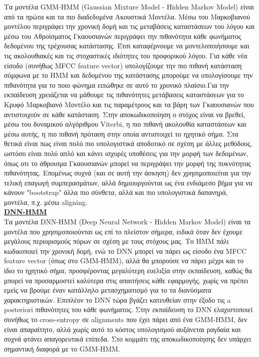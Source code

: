 \documentclass{article}
\begin{document}
Τα μοντέλα GMM-HMM (Gaussian Mixture Model - Hidden Markov Model) είναι από τα πρώτα και τα πιο διαδεδομένα Ακουστικά Μοντέλα. Μέσω του Μαρκοβιανού μοντέλου περιγράφει την χρονική δομή και τις μεταβάσεις καταστάσεων του λόγου και μέσω του Αθροίσματος Γκαουσιανών περιγράφει την πιθανότητα κάθε φωνήματος δεδομένου της τρέχουσας κατάστασης. Έτσι καταφέρνουμε να μοντελοποιήσουμε και τις ακολουθιακές και τις στοχαστικές ιδιότητες του προφορικού λόγου. Για κάθε νέα είσοδο (συνήθως MFCC feature vector) υπολογίζουμε την πιο πιθανή κατάσταση σύμφωνα με το HMM και δεδομένου της κατάστασης μπορούμε να υπολογίσουμε την πιθανότητα για το ποιο φώνημα ειπώθηκε σε αυτό το χρονικό πλαίσιο.Για την εκπαίδευση χρειάζεται να μάθουμε τις πιθανότητες μετάβασεις καταστάσεων για το Κρυφό Μαρκοβιανό Μοντέλο και τις παραμέτρους και τα βάρη των Γκαουσιανών που αντιστοιχούν σε κάθε κατάσταση. Στην αποκωδικοποίηση ο στόχος είναι να βρεθεί, μέσω του δυναμικού αλγόριθμου Viterbi, η πιο πιθανή ακολουθία καταστάσεων και μέσω αυτής, η πιο πιθανή πρόταση στην οποία αντιστοιχεί το ηχητικό σήμα. Στα θετικά είναι πως είναι πολύ πιο υπολογιστικά αποδοτικό σε σχέση με άλλες μεθόδους, ωστόσο είναι πολύ απλό και κάνει ισχυρές υποθέσεις για την μορφή των δεδομένων, όπως οτι το άθροισμα Γκαουσιανών μπορεί να περιγράψει την μορφή της πυκνότητας πιθανότητας. Επομένως συχνά (και σε αυτή την άσκηση) δεν χρησιμοποιείται για την τελική επαγωγή συμπερασμάτων, αλλά δημιουργούνται ως ένα ενδιάμεσο βήμα για να κάνουν "bootstrap" άλλα πιο σύνθετα, αλλά και πιο υπολογιστικά δαπανηρά, μοντέλα, π.χ. μέσω aligning.
%
\\[5mm]
\textbf{\underline{DNN-HMM}}
\label{dnn-hmm}
\\[1mm]
Τα μοντέλα DNN-HMM (Deep Neural Network - Hidden Markov Model) είναι τα μοντέλα που χρησιμοποιούνται ως επί το πλείστον σήμερα, ειδικά όταν δεν έχουμε μεγάλους περιορισμούς πόρων σε σχέση με τους στόχους μας. Το HMM πάλι κωδικοποιεί την χρονική δομή, ενώ το DNN μπορεί να πάρει ως είσοδο ένα MFCC feature vector (όπως στο GMM-HMM), αλλά θα μπορούσε να πάρει μέχρι και το ίδιο το ηχητικό σήμα, προσφέροντας μεγαλύτερη ευελιξία στην εκπαίδευση, καθώς θα μπορεί να προσαρμοστεί καλύτερα στις απαιτήσεις κάθε εφαρμογής, χωρίς να πρέπει εμείς να βρούμε έναν κατάλληλο μετασχηματισμό για το τα διανύσματα χαρακτηριστικών. Επιπλέον το DNN τώρα βγάζει κατευθείαν στην έξοδο τις a posteriori πιθανότητες του κάθε φωνήματος. Στην εκπαίδευση το DNN ελαχιστοποιεί συνήθως το cross-entropy σε alignments που έχει πάρει από ένα GMM-HMM, δεν είναι απαραίτητο, αλλά χωρίς αυτό το κόστος υπολογισμού αυξάνεται ραγδαία και συχνά φτάνει απαγορευτικά επίπεδα.  Στο κομμάτι της αποκωδικοποίησης δεν υπάρχει σημαντική διαφορά με το GMM-HMM.
\end{document}
